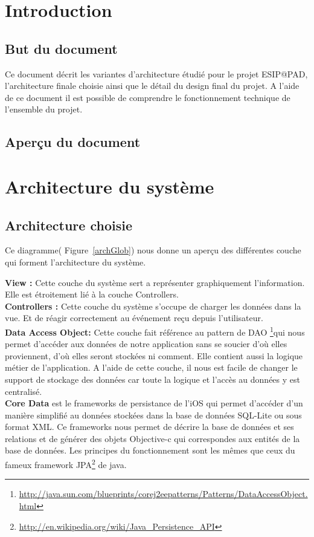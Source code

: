 \section{Introduction}
	\subsection{But du document}
		Ce document décrit les variantes d'architecture étudié pour le projet ESIP@PAD, l'architecture finale choisie ainsi que le détail du design final du projet. A l'aide de ce document il est possible de comprendre le fonctionnement technique de l'ensemble du projet.
	\subsection{Aperçu du document}
\section{Architecture du système }
	\subsection{Architecture choisie}	
		 Ce diagramme( Figure~\ref{archGlob}) nous donne un aperçu des différentes couche qui forment l'architecture du système.
		 
		 \textbf{View : } Cette couche du système sert a représenter graphiquement l'information. Elle est étroitement lié à la couche Controllers.\\[0.5cm]
		 \textbf{Controllers :} Cette couche du système s'occupe de charger les données dans la vue. Et de réagir correctement au événement reçu depuis l'utilisateur.\\[0.5cm]
		\textbf{Data Access Object:} Cette couche fait référence au pattern  de DAO \footnote{\url{http://java.sun.com/blueprints/corej2eepatterns/Patterns/DataAccessObject.html}}qui nous permet d'accéder aux données de notre application sans se soucier d'où elles proviennent, d'où elles seront stockées ni comment. Elle contient aussi la logique métier de l'application. A l'aide de cette couche, il nous est facile de changer le support de stockage des données car toute la logique et l'accès au données y est centralisé. \\[0.5cm]
		\textbf{Core Data} est le frameworks de persistance de l'iOS qui permet d'accéder d'un manière simplifié au données stockées dans la base de données SQL-Lite ou sous format XML. Ce frameworks nous permet de décrire la base de données et ses relations et de générer des objets Objective-c qui correspondes aux entités de la base de données. Les principes du fonctionnement sont les mêmes que ceux du fameux framework JPA\footnote{\url{http://en.wikipedia.org/wiki/Java_Persistence_API}} de java.


